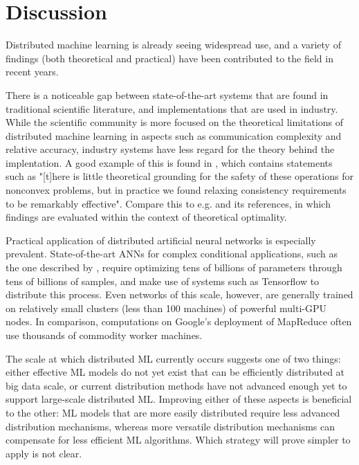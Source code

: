 \section{Discussion}
Distributed machine learning is already seeing widespread use, and a variety of findings (both theoretical and practical) have been contributed to the field in recent years.

There is a noticeable gap between state-of-the-art systems that are found in traditional scientific literature, and implementations that are used in industry. While the scientific community is more focused on the theoretical limitations of distributed machine learning in aspects such as communication complexity and relative accuracy, industry systems have less regard for the theory behind the implentation. A good example of this is found in \citep{DistBelief2012}, which contains statements such as "[t]here is little theoretical grounding for the safety of these operations for nonconvex problems, but in practice we found relaxing consistency requirements to be remarkably effective". Compare this to e.g. \citep{Xing16} and its references, in which findings are evaluated within the context of theoretical optimality.

Practical application of distributed artificial neural networks is especially prevalent. State-of-the-art ANNs for complex conditional applications, such as the one described by \citet{Shazeer2017}, require optimizing tens of billions of parameters through tens of billions of samples, and make use of systems such as Tensorflow\citep{Tensorflow2015}\citep{Tensorflow2016} to distribute this process. Even networks of this scale, however, are generally trained on relatively small clusters (less than 100 machines) of powerful multi-GPU nodes. In comparison, computations on Google's deployment of MapReduce\citep{MapReduce} often use thousands of commodity worker machines.

The scale at which distributed ML currently occurs suggests one of two things: either effective ML models do not yet exist that can be efficiently distributed at big data scale, or current distribution methods have not advanced enough yet to support large-scale distributed ML. Improving either of these aspects is beneficial to the other: ML models that are more easily distributed require less advanced distribution mechanisms, whereas more versatile distribution mechanisms can compensate for less efficient ML algorithms. Which strategy will prove simpler to apply is not clear.